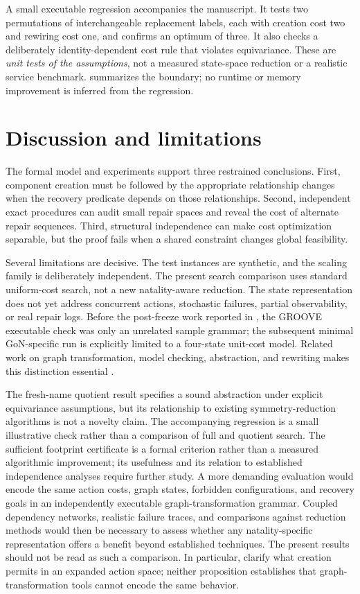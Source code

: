 \documentclass[11pt,a4paper]{article}
\begin{document}
A small executable regression accompanies the manuscript. It tests two permutations of interchangeable replacement labels, each with creation cost two and rewiring cost one, and confirms an optimum of three. It also checks a deliberately identity-dependent cost rule that violates equivariance. These are \emph{unit tests of the assumptions}, not a measured state-space reduction or a realistic service benchmark.  summarizes the boundary; no runtime or memory improvement is inferred from the regression.

\section{Discussion and limitations}
The formal model and experiments support three restrained conclusions. First, component creation must be followed by the appropriate relationship changes when the recovery predicate depends on those relationships. Second, independent exact procedures can audit small repair spaces and reveal the cost of alternate repair sequences. Third, structural independence can make cost optimization separable, but the proof fails when a shared constraint changes global feasibility.

Several limitations are decisive. The test instances are synthetic, and the scaling family is deliberately independent. The present search comparison uses standard uniform-cost search, not a new natality-aware reduction. The state representation does not yet address concurrent actions, stochastic failures, partial observability, or real repair logs. Before the post-freeze work reported in , the GROOVE executable check was only an unrelated sample grammar; the subsequent minimal GoN-specific run is explicitly limited to a four-state unit-cost model. Related work on graph transformation, model checking, abstraction, and rewriting makes this distinction essential \cite{Ghamarian2012,Emerson2005,Konig2025,Campbell2021,Adam2026,Ghasemi2026}.

The fresh-name quotient result specifies a sound abstraction under explicit equivariance assumptions, but its relationship to existing symmetry-reduction algorithms is not a novelty claim. The accompanying regression is a small illustrative check rather than a comparison of full and quotient search. The sufficient footprint certificate is a formal criterion rather than a measured algorithmic improvement; its usefulness and its relation to established independence analyses require further study. A more demanding evaluation would encode the same action costs, graph states, forbidden configurations, and recovery goals in an independently executable graph-transformation grammar. Coupled dependency networks, realistic failure traces, and comparisons against reduction methods would then be necessary to assess whether any natality-specific representation offers a benefit beyond established techniques. The present results should not be read as such a comparison. In particular,  clarify what creation permits in an expanded action space; neither proposition establishes that graph-transformation tools cannot encode the same behavior.
\end{document}
